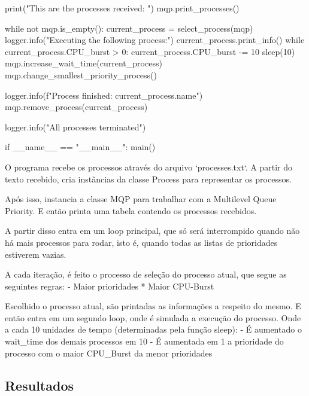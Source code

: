 \begin{python}
        print("This are the processes received: ")
        mqp.print_processes()

        while not mqp.is_empty():
            current_process = select_process(mqp)
            logger.info("Executing the following process:")
            current_process.print_info()        
            while current_process.CPU_burst > 0:
                current_process.CPU_burst -= 10
                sleep(10)
                mqp.increase_wait_time(current_process)
                mqp.change_smallest_priority_process()

            logger.info(f"Process finished: {current_process.name}\n")
            mqp.remove_process(current_process)
        
        logger.info("All processes terminated")

    if __name__ == "__main__":
        main()
\end{python}

O programa recebe os processos através do arquivo `processes.txt`. A partir do texto recebido, cria instâncias da classe Process para representar os processos.

Após isso, instancia a classe MQP para trabalhar com a Multilevel Queue Priority. E então printa uma tabela contendo os processos recebidos.

A partir disso entra em um loop principal, que só será interrompido quando não há mais processos para rodar, isto é, quando todas as listas de prioridades estiverem vazias.

A cada iteração, é feito o processo de seleção do processo atual, que segue as seguintes regras:
- Maior prioridades
* Maior CPU-Burst

Escolhido o processo atual, são printadas as informações a respeito do mesmo. E então entra em um segundo loop, onde é simulada a execução do processo. Onde a cada 10 unidades de tempo (determinadas pela função sleep):
- É aumentado o wait_time dos demais processos em 10
- É aumentada em 1 a prioridade do processo com o maior CPU_Burst da menor prioridades

\subsection*{Resultados}

